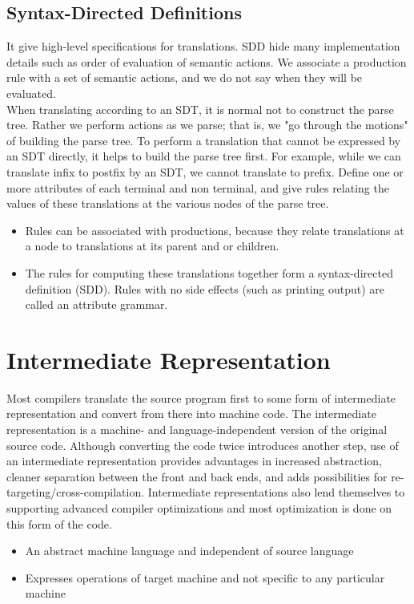\documentclass[12pt, oneside, a4paper]{article}
\begin{document}
\subsection{Syntax-Directed Definitions}
It give high-level specifications for translations. SDD hide many implementation details such as order of evaluation of semantic actions. We associate a production rule with a set of semantic actions, and we do not say when they will be evaluated.\\
When translating according to an SDT, it is normal not to construct the parse tree. Rather we perform actions as we parse; that is, we "go through the motions" of building the parse tree. To perform a translation that cannot be expressed by an SDT directly, it helps to build the parse tree first. For example, while we can translate infix to postfix by an SDT, we cannot translate to prefix. Define one or more attributes of each terminal and non terminal, and give rules relating the values of these translations at the various nodes of the parse tree.\\
\begin{itemize}
\item Rules can be associated with productions, because they relate translations at a node to translations at its parent and or children.\\
\item The rules for computing these translations together form a syntax-directed definition (SDD). Rules with no side effects (such as printing output) are called an attribute grammar.
\end{itemize}

\section{Intermediate Representation}
Most compilers translate the source program first to some form of intermediate representation and convert from there into machine code. The intermediate representation is a machine- and language-independent version of the original source code. Although converting the code twice introduces another step, use of an intermediate representation provides advantages in increased abstraction, cleaner separation between the front and back ends, and adds possibilities for re-targeting/cross-compilation. Intermediate representations also lend themselves to supporting advanced compiler optimizations and most optimization is done on this form of the code.

\begin{itemize}
\item An abstract machine language and independent of source language
\item Expresses operations of target machine and not specific to any particular machine
\end{itemize}
\end{document}
